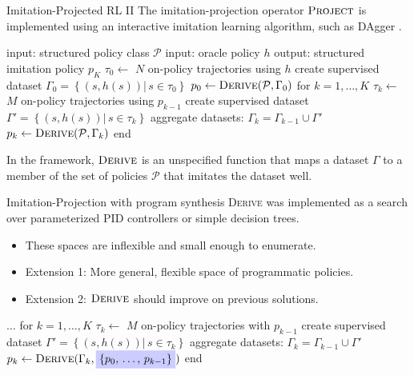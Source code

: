 \begin{frame}[fragile]{Imitation-Projected RL II}
The imitation-projection operator $\textsc{Project}$ is implemented using an interactive imitation learning algorithm, such as DAgger \citep{ross2011reduction}.

\begin{algorithm}[caption={$\textsc{Project}$: imitation learning}]
 input: structured policy class $\mathcal{P}$
 input: oracle policy $h$
 output: structured imitation policy $p_K$
 $\tau_0 \leftarrow $ $N$ on-policy trajectories using $h$
 create supervised dataset $\Gamma_0 = \left\{\left(s, h(s)\right) |\, s \in \tau_0 \right\}$
 $p_0 \leftarrow \textsc{Derive}(\mathcal{P}, \Gamma_0)$
 for $k = 1, \dots, K$
   $\tau_k \leftarrow $ $M$ on-policy trajectories using $p_{k-1}$
   create supervised dataset $\Gamma' = \left\{\left(s, h(s)\right) |\, s \in \tau_k \right\}$
   aggregate datasets: $\Gamma_k = \Gamma_{k-1} \cup \Gamma' \quad$
   $p_k \leftarrow \textsc{Derive}(\mathcal{P}, \Gamma_k)$
 end
\end{algorithm}

In the framework, $\textsc{Derive}$ is an unspecified function that maps a dataset $\Gamma$ to a member of the set of policies $\mathcal{P}$ that imitates the dataset well.


\end{frame}




\begin{frame}[fragile]{Imitation-Projection with program synthesis}
\textsc{Derive} was implemented as a search over parameterized PID controllers or simple decision trees.

\begin{itemize}
    \item These spaces are inflexible and small enough to enumerate.
    \item Extension 1: More general, flexible space of programmatic policies.
    \item Extension 2: $\textsc{Derive}$ should improve on previous solutions.
\end{itemize}

\begin{algorithm}[caption={$\textsc{Project}$: imitation learning by improvement}]
 $\dots$
 for $k = 1, \dots, K$
   $\tau_k \leftarrow $ $M$ on-policy trajectories with $p_{k-1}$
   create supervised dataset $\Gamma' = \left\{\left(s, h(s)\right) |\, s \in \tau_k \right\}$
   aggregate datasets: $\Gamma_k = \Gamma_{k-1} \cup \Gamma' \quad$
   $p_k \leftarrow \textsc{Derive}(\Gamma_k, \highlight{\{p_0,\,\dots,\,p_{k-1}\}})$
 end
\end{algorithm}
\end{frame}

